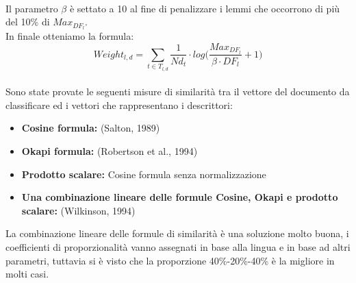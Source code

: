 \documentclass{article}
\theoremstyle{plain}
\theoremstyle{definition}
\begin{document}
\\
Il parametro $\beta$ è settato a 10 al fine di penalizzare i lemmi che occorrono di più del 10\% di $Max_{DF_{l}}$.
\\
In finale otteniamo la formula:
\\
\[Weight_{l,d}=\sum_{t \in T_{l,d}} \frac{1}{Nd_t} \cdot log \Bigg(\frac{Max_{DF_{l}}}{\beta \cdot DF_l}+1 \Bigg) \]
\\
Sono state provate le seguenti misure di similarità tra il vettore del documento da classificare ed i vettori che rappresentano i descrittori:
\begin{itemize}
\item \textbf{Cosine formula:} (Salton, 1989)\footnotemark{}
\item \textbf{Okapi formula:} (Robertson et al., 1994)\footnotemark
\item  \textbf{Prodotto scalare:} Cosine formula senza normalizzazione
\item \textbf{Una combinazione lineare delle formule Cosine, Okapi e prodotto scalare:} (Wilkinson, 1994)
\end{itemize}
La combinazione lineare delle formule di similarità è una soluzione molto buona, i coefficienti di proporzionalità vanno assegnati in base alla lingua e in base ad altri parametri, tuttavia si è visto che la proporzione 40\%-20\%-40\% è la migliore in molti casi.


\newpage
\end{document}
